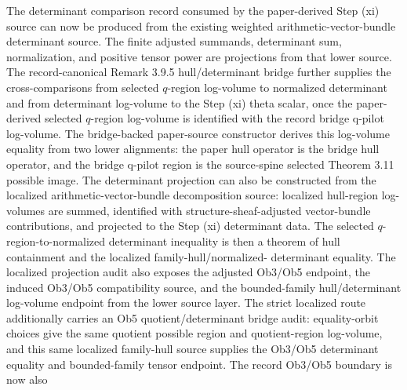 \begin{proposition}
  \leanok
  The determinant comparison record consumed by the paper-derived Step (xi)
  source can now be produced from the existing weighted arithmetic-vector-bundle
  determinant source.  The finite adjusted summands, determinant sum,
  normalization, and positive tensor power are projections from that lower
  source.  The record-canonical Remark 3.9.5 hull/determinant bridge further
  supplies the cross-comparisons from selected \(q\)-region log-volume to
  normalized determinant and from determinant log-volume to the Step (xi) theta
  scalar, once the paper-derived selected \(q\)-region log-volume is identified
  with the record bridge q-pilot log-volume.  The bridge-backed paper-source
  constructor derives this log-volume equality from two lower alignments: the
  paper hull operator is the bridge hull operator, and the bridge q-pilot
  region is the source-spine selected Theorem 3.11 possible image.  The
  determinant projection can also be constructed from the localized
  arithmetic-vector-bundle decomposition source: localized hull-region
  log-volumes are summed, identified with structure-sheaf-adjusted
  vector-bundle contributions, and projected to the Step (xi) determinant data.
  The selected \(q\)-region-to-normalized determinant inequality is then a
  theorem of hull containment and the localized family-hull/normalized-
  determinant equality.  The localized projection audit also exposes the
  adjusted Ob3/Ob5 endpoint, the induced Ob3/Ob5 compatibility source, and the
  bounded-family hull/determinant log-volume endpoint from the lower source
  layer.  The strict localized route additionally carries an Ob5
  quotient/determinant bridge audit: equality-orbit choices give the same
  quotient possible region and quotient-region log-volume, and this same
  localized family-hull source supplies the Ob3/Ob5 determinant equality and
  bounded-family tensor endpoint.  The record Ob3/Ob5 boundary is now also

\end{proposition}
